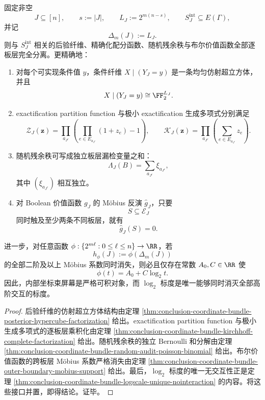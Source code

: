 \begin{theorem}[内部坐标束屏幕的完全可积性与唯一无交互标度]\label{thm:conclusion-integrable-screen-complete-separation-logscale}
固定非空
\[
J\subseteq [n],
\qquad
s:=|J|,
\qquad
L_J:=2^{m(n-s)},
\qquad
S_J^{\mathrm{int}}\subseteq E(\Gamma),
\]
并记
\[
\Delta_m(J):=L_J.
\]
则与 \(S_J^{\mathrm{int}}\) 相关的后验纤维、精确化配分函数、随机残余秩与布尔价值函数全部逐板层完全分离。更精确地：
\begin{enumerate}
  \item 对每个可实现条件值 \(y\)，条件纤维 \(X\mid(Y_J=y)\) 是一条均匀仿射超立方体，并且
  \[
  X\mid(Y_J=y)\cong \FF_2^{L_J}.
  \]

  \item exactification partition function 与极小 exactification 生成多项式分别满足
  \[
  \mathcal Z_J(\mathbf z)
  =
  \prod_{a_{J^c}}
  \left(
  \prod_{e\in E_{a_{J^c}}}(1+z_e)-1
  \right),
  \qquad
  \mathcal K_J(\mathbf z)
  =
  \prod_{a_{J^c}}
  \left(
  \sum_{e\in E_{a_{J^c}}}z_e
  \right).
  \]

  \item 随机残余秩可写成独立板层漏检变量之和：
  \[
  \Lambda_J(B)=\sum_{a_{J^c}}\xi_{a_{J^c}},
  \]
  其中 \((\xi_{a_{J^c}})\) 相互独立。

  \item 对 Boolean 价值函数 \(g_J\) 的 Möbius 反演 \(\widehat g_J\)，只要
  \[
  S\subseteq \mathcal E_J
  \]
  同时触及至少两条不同板层，就有
  \[
  \widehat g_J(S)=0.
  \]
\end{enumerate}
进一步，对任意函数 \(\phi:\{2^{m\ell}:0\le \ell\le n\}\to \RR\)，若
\[
h_\phi(J):=\phi(\Delta_m(J))
\]
的全部二阶及以上 Möbius 系数同时消失，则必且仅存在常数 \(A_0,C\in\RR\) 使
\[
\phi(t)=A_0+C\log_2 t.
\]
因此，内部坐标束屏幕是严格可积对象，而 \(\log_2\) 标度是唯一能够同时消灭全部高阶交互的标度。
\end{theorem}
\begin{proof}
后验纤维的仿射超立方体结构由定理 \ref{thm:conclusion-coordinate-bundle-posterior-hypercube-factorization} 给出。exactification partition function 与极小生成多项式的逐板层乘积化由定理 \ref{thm:conclusion-coordinate-bundle-kirchhoff-complete-factorization} 给出。随机残余秩的独立 Bernoulli 和分解由定理 \ref{thm:conclusion-coordinate-bundle-random-audit-poisson-binomial} 给出。布尔价值函数的跨板层 Möbius 系数严格消失由定理 \ref{thm:conclusion-coordinate-bundle-outer-boundary-mobius-support} 给出。最后，\(\log_2\) 标度的唯一无交互性正是定理 \ref{thm:conclusion-coordinate-bundle-logscale-unique-nointeraction} 的内容。将这些接口并置，即得结论。证毕。
\end{proof}

